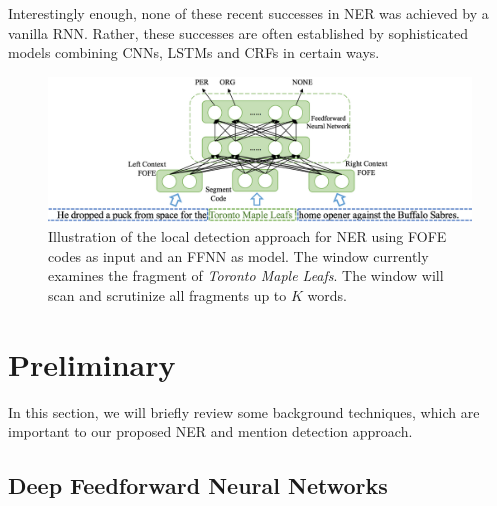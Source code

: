 \documentclass[11pt,a4paper]{article}
\begin{document}
Interestingly enough, none of these recent successes in NER was achieved by a vanilla RNN. Rather, 
these successes are often established by sophisticated models combining CNNs, LSTMs and CRFs in certain ways. 

\begin{figure}[t]
	\centering
	\includegraphics[width=0.86\linewidth]{figure-diagram-v5}
	\caption{Illustration of the local detection approach for NER using FOFE codes as input and an FFNN as model. The window currently examines the fragment of {\it Toronto Maple Leafs}. The window will scan and scrutinize all fragments up to $K$ words. }
	\label{Fig:FOFE-NER-diagram}
\end{figure}


\section{Preliminary}

In this section, we will briefly review some background techniques, which are important to our proposed NER and mention detection approach. 

\subsection{Deep Feedforward Neural Networks}
\end{document}
